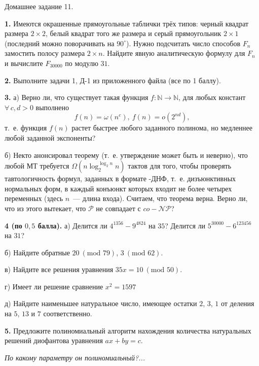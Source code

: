 \documentclass[12pt,a5paper,fleqn]{article}
\begin{document}
\begin{center}
{ \Large Домашнее задание 11.}

\end{center}

{\bf 1.} Имеются окрашенные прямоугольные таблички трёх типов: черный квадрат размера $2\times 2$, белый квадрат того же размера и серый прямоугольник $2\times 1$ (последний можно поворачивать на $90^\circ$). Нужно подсчитать число способов $F_n$ замостить полосу размера $2\times n$. Найдите явную аналитическую формулу для $F_n$ и вычислите $F_{30000}$ по модулю $31$. 

\smallskip

{\bf 2.} Выполните задачи 1, Д-1 из приложенного файла (все по 1 баллу).

\smallskip

{\bf 3.} а) Верно ли, что существует такая функция $f: \mathbb{N} \rightarrow  \mathbb{N}$, для любых констант $\forall\, c,d> 0$ выполнено $$f(n) = \omega(n^c),\ f(n) = o(2^{nd}),$$ т.~е. функция $f(n)$ растет быстрее любого заданного полинома, но медленнее любой заданной экспоненты?

б) Некто анонсировал теорему (т.~е. утверждение может быть и неверно), что любой МТ требуется $\Omega(n \log_2^{\log_2 n} n)$ тактов для того, чтобы проверять тавтологичность формул, заданных в формате  {-ДНФ}, т.~е. дизъюнктивных нормальных форм, в каждый конъюнкт которых входит не более четырех переменных (здесь $n$~--- длина входа).  Считаем, что теорема верна. Верно ли, что из этого вытекает, что $\mathcal{P}$ не совпадает с $co-\mathcal{NP}$?

\smallskip

{\bf 4 (по $0{,}5$ балла).} а) Делится ли $4^{1356}-9^{4824}$ на $35$? Делится ли $5^{30000} - 6^{123456}$ на $31$?

б) Найдите обратные $20 \ (\mbox{mod } 79)$, $3 \ (\mbox{mod } 62)$.

в) Найдите все решения уравнения $35x = 10 \ (\mbox{mod } 50)$.

г) Имеет ли решение сравнение $x^2 = 1597 $

д) Найдите наименьшее натуральное число, имеющее остатки $2$, $3$, $1$ от деления на $5$, $13$ и $7$ соответственно.

{\bf 5.} Предложите полиномиальный алгоритм нахождения количества натуральных решений диофантова уравнения $ax+by = c$. 

\textit{По какому параметру он полиномиальный?...}
\end{document}
